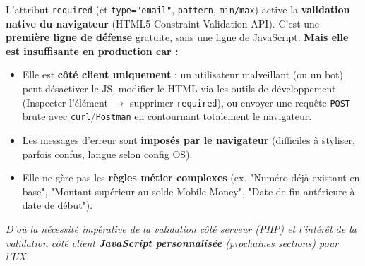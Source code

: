 \documentclass[11pt]{article}
\begin{document}
\begin{savaistu}
L'attribut \texttt{required} (et \texttt{type="email"}, \texttt{pattern}, \texttt{min/max}) active la \textbf{validation native du navigateur} (HTML5 Constraint Validation API). C'est une \textbf{première ligne de défense} gratuite, sans une ligne de JavaScript.
\textbf{Mais elle est insuffisante en production car :}
\begin{itemize}
    \item Elle est \textbf{côté client uniquement} : un utilisateur malveillant (ou un bot) peut désactiver le JS, modifier le HTML via les outils de développement (Inspecter l'élément $\rightarrow$ supprimer \texttt{required}), ou envoyer une requête \texttt{POST} brute avec \texttt{curl}/\texttt{Postman} en contournant totalement le navigateur.
    \item Les messages d'erreur sont \textbf{imposés par le navigateur} (difficiles à styliser, parfois confus, langue selon config OS).
    \item Elle ne gère pas les \textbf{règles métier complexes} (ex. "Numéro déjà existant en base", "Montant supérieur au solde Mobile Money", "Date de fin antérieure à date de début").
\end{itemize}
\emph{D'où la nécessité impérative de la validation côté serveur (PHP) et l'intérêt de la validation côté client \textbf{JavaScript personnalisée} (prochaines sections) pour l'UX.}
\end{savaistu}
\end{document}
